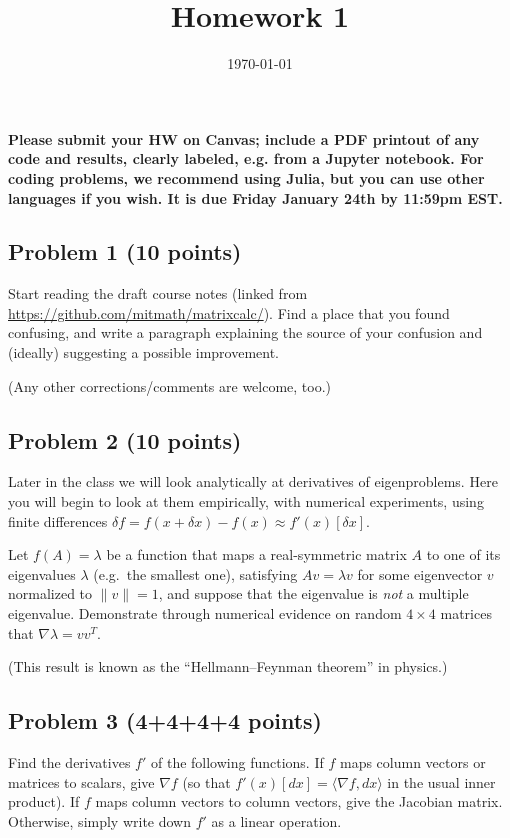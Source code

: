 \documentclass[10pt,oneside]{article}
\author{}
\title{Homework 1}
\date{\today}
\begin{document}
\maketitle
\thispagestyle{fancy} 

{\bf Please submit your HW on Canvas; include a PDF printout of any code and results, clearly labeled, e.g. from a Jupyter notebook.  For coding problems, we recommend using Julia, but you can use other languages if you wish. It is due Friday January 24th by 11:59pm EST.  }

\subsection*{Problem 1 (10 points)}

Start reading the draft course notes (linked from \url{https://github.com/mitmath/matrixcalc/}).   Find a place that you found confusing, and write a paragraph explaining the source of your confusion and (ideally) suggesting a possible improvement.

(Any other corrections/comments are welcome, too.)

\subsection*{Problem 2 (10 points)}

Later in the class we will look analytically at derivatives of eigenproblems.  Here you will begin to look at them empirically, with numerical experiments, using finite differences $\delta f = f(x+\delta x) - f(x) \approx f'(x)[\delta x]$.

    Let $f(A) = \lambda$ be a function that maps a real-symmetric matrix $A$ to one of its eigenvalues $\lambda$ (e.g.~the smallest one), satisfying $Av = \lambda v$ for some eigenvector $v$ normalized to $\| v \| = 1$, and suppose that the eigenvalue is \emph{not} a multiple eigenvalue. Demonstrate through numerical evidence  on random $4 \times 4$ matrices that $ \nabla \lambda = vv^T$.
    
(This result is known as the ``Hellmann--Feynman theorem'' in physics.)

\subsection*{Problem 3 (4+4+4+4 points)}

Find the derivatives $f'$ of the following functions.  If $f$ maps column vectors or matrices to scalars, give $\nabla f$ (so that $f'(x)[dx] = \langle \nabla f,  dx\rangle$ in the usual inner product). If $f$ maps column vectors to column vectors, give the Jacobian matrix.  Otherwise, simply write down $f'$ as a linear operation.
\end{document}
